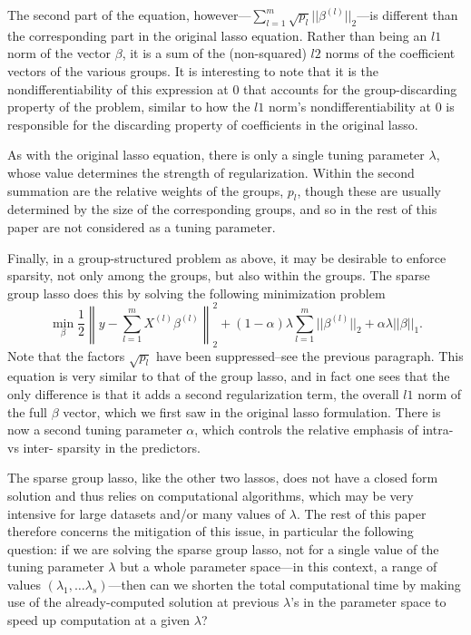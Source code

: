 \documentclass[titlepage]{article}
\newcommand{\norm}[1]{\left\lVert #1 \right\rVert}
\begin{document}
The second part of the equation, however---$\sum_{l=1}^m\sqrt{p_l}||\beta^{(l)}||_2$---is different than the corresponding part in the original lasso equation. Rather than being an $l1$ norm of the vector $\beta$, it is a sum of the (non-squared) $l2$ norms of the coefficient vectors of the various groups. It is interesting to note that it is the nondifferentiability of this expression at $0$ that accounts for the group-discarding property of the problem, similar to how the $l1$ norm's nondifferentiability at 0 is responsible for the discarding property of coefficients in the original lasso. 

As with the original lasso equation, there is only a single tuning parameter $\lambda$, whose value determines the strength of regularization. Within the second summation are the relative weights of the groups, $p_l$, though these are usually determined by the size of the corresponding groups, and so in the rest of this paper are not considered as a tuning parameter.

Finally, in a group-structured problem as above, it may be desirable to enforce sparsity, not only among the groups, but also within the groups. The sparse group lasso \citep{simon2013sparse} does this by solving the following minimization problem
\begin{equation}
  \label{eq:sparsegl}
\min_{\beta}\frac{1}{2}\norm{y-\sum_{l=1}^mX^{(l)}\beta^{(l)}}_2^2 + (1-\alpha)\lambda\sum_{l=1}^m||\beta^{(l)}||_2+\alpha\lambda||\beta||_1.
\end{equation}
Note that the factors $\sqrt{p_l}$ have been suppressed--see the previous paragraph.  This equation is very similar to that of the group lasso, and in fact one sees that the only difference is that it adds a second regularization term, the overall $l1$ norm of the full $\beta$ vector, which we first saw in the original lasso formulation.  There is now a second tuning parameter $\alpha$, which controls the relative emphasis of intra- vs inter- sparsity in the predictors.

The sparse group lasso, like the other two lassos, does not have a closed form solution and thus relies on computational algorithms, which may be very intensive for large datasets and/or many values of $\lambda$. The rest of this paper therefore concerns the mitigation of this issue, in particular the following question: if we are solving the sparse group lasso, not for a single value of the tuning parameter $\lambda$ but a whole parameter space---in this context, a range of values $(\lambda_1,\dots \lambda_s)$---then can we shorten the total computational time by making use of the already-computed solution at previous $\lambda$'s in the parameter space to speed up computation at a given $\lambda$?
\end{document}

